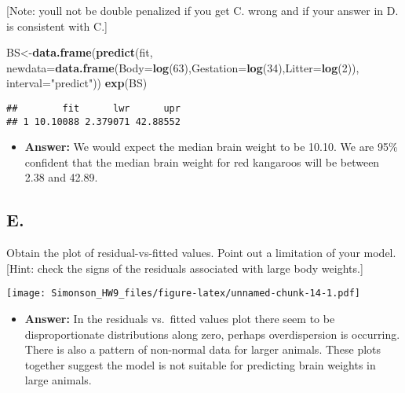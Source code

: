 \documentclass[]{article}
\newenvironment{Shaded}{\begin{snugshade}}{\end{snugshade}}
\newcommand{\KeywordTok}[1]{\textcolor[rgb]{0.13,0.29,0.53}{\textbf{#1}}}
\newcommand{\DataTypeTok}[1]{\textcolor[rgb]{0.13,0.29,0.53}{#1}}
\newcommand{\DecValTok}[1]{\textcolor[rgb]{0.00,0.00,0.81}{#1}}
\newcommand{\StringTok}[1]{\textcolor[rgb]{0.31,0.60,0.02}{#1}}
\newcommand{\NormalTok}[1]{#1}
\providecommand{\tightlist}{%
  \setlength{\itemsep}{0pt}\setlength{\parskip}{0pt}}
\begin{document}
{[}Note: youll not be double penalized if you get C. wrong and if your
answer in D. is consistent with C.{]}

\begin{Shaded}
\begin{Highlighting}[]
\NormalTok{BS<-}\KeywordTok{data.frame}\NormalTok{(}\KeywordTok{predict}\NormalTok{(fit,}
                       \DataTypeTok{newdata=}\KeywordTok{data.frame}\NormalTok{(}\DataTypeTok{Body=}\KeywordTok{log}\NormalTok{(}\DecValTok{63}\NormalTok{),}\DataTypeTok{Gestation=}\KeywordTok{log}\NormalTok{(}\DecValTok{34}\NormalTok{),}\DataTypeTok{Litter=}\KeywordTok{log}\NormalTok{(}\DecValTok{2}\NormalTok{)),}
                       \DataTypeTok{interval=}\StringTok{"predict"}\NormalTok{))}
\KeywordTok{exp}\NormalTok{(BS)}
\end{Highlighting}
\end{Shaded}

\begin{verbatim}
##        fit      lwr      upr
## 1 10.10088 2.379071 42.88552
\end{verbatim}

\begin{itemize}
\tightlist
\item
  \textbf{Answer:} We would expect the median brain weight to be 10.10.
  We are 95\% confident that the median brain weight for red kangaroos
  will be between 2.38 and 42.89.
\end{itemize}

\subsection{E.}\label{e.-2}

Obtain the plot of residual-vs-fitted values. Point out a limitation of
your model. {[}Hint: check the signs of the residuals associated with
large body weights.{]}

\texttt{[image: Simonson\_HW9\_files/figure-latex/unnamed-chunk-14-1.pdf]}

\begin{itemize}
\tightlist
\item
  \textbf{Answer:} In the residuals vs.~fitted values plot there seem to
  be disproportionate distributions along zero, perhaps overdispersion
  is occurring. There is also a pattern of non-normal data for larger
  animals. These plots together suggest the model is not suitable for
  predicting brain weights in large animals.
\end{itemize}
\end{document}
